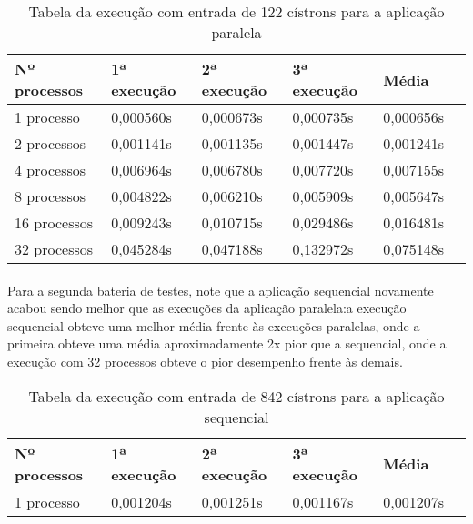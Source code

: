\documentclass[a4paper,10pt]{article}
\begin{document}
\begin{table}[!htb]
\begin{tabular}{| l | l | l | l | l | p{5cm} |} 
\hline
Nº processos & 1ª execução & 2ª execução & 3ª execução & Média\\ \hline
1  processo & 0,000560s  &  0,000673s  &  0,000735s  &  0,000656s  \\ \hline
2 processos & 0,001141s  &  0,001135s  &  0,001447s  & 0,001241s  \\ \hline
4 processos & 0,006964s  &  0,006780s  &  0,007720s  &  0,007155s  \\ \hline
8 processos & 0,004822s  &  0,006210s  &  0,005909s  &  0,005647s  \\ \hline
16 processos & 0,009243s &  0,010715s  &  0,029486s  &  0,016481s    \\ \hline
32 processos & 0,045284s  &  0,047188s  &  0,132972s  &  0,075148s  \\ \hline
\end{tabular}
\caption{Tabela da execução com entrada de 122 cístrons para a aplicação paralela}
\end{table}

\paragraph{}Para a segunda bateria de testes, note que a aplicação sequencial novamente acabou sendo melhor que as execuções da aplicação paralela:a execução sequencial obteve uma melhor média frente às execuções paralelas, onde a primeira obteve uma média aproximadamente 2x pior que a sequencial, onde a execução com 32 processos obteve o pior desempenho frente às demais.\\

\begin{table}[!htb]
\begin{tabular}{| l | l | l | l | l | p{5cm} |} 
\hline
  Nº processos & 1ª execução & 2ª execução & 3ª execução & Média\\ \hline
 1  processo & 0,001204s  &  0,001251s  &  0,001167s  &  0,001207s \\ \hline
\end{tabular}
\caption{Tabela da execução com entrada de 842 cístrons para a aplicação sequencial}
\end{table}
\end{document}
